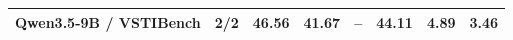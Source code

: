 \begin{table}[t]
{\begin{tabular}{lrrrrrrr}
Qwen3.5-9B / VSTIBench & 2/2 & 46.56 & 41.67 & -- & 44.11 & 4.89 & 3.46 \\
\bottomrule
\end{tabular}%
}
\end{table}
